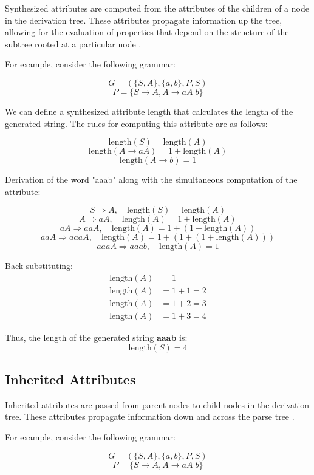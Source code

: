 Synthesized attributes are computed from the attributes of the children of a node in the derivation tree. These attributes propagate information up the tree, allowing for the evaluation of properties that depend on the structure of the subtree rooted at a particular node \cite{cit5}.

For example, consider the following grammar:

\[ G = ( \{S, A\}, \{a, b\}, P, S ) \]
\[  P = \{ S \rightarrow A, A \rightarrow aA | b \} \]
  
We can define a synthesized attribute \( \text{length} \) that calculates the length of the generated string. The rules for computing this attribute are as follows:
  
  
\[  \text{length}(S) = \text{length}(A) \]
\[  \text{length}(A \rightarrow aA) = 1 + \text{length}(A) \]
\[ \text{length}(A \rightarrow b) = 1 \]

Derivation of the word "aaab" along with the simultaneous computation of the attribute:

\[S \Rightarrow A , \quad \text{length}(S) = \text{length}(A)\] 
\[ A \Rightarrow aA , \quad \text{length}(A) = 1 + \text{length}(A)  \]
\[  aA \Rightarrow aaA , \quad \text{length}(A) = 1 + (1 + \text{length}(A))  \]
\[  aaA \Rightarrow aaaA , \quad \text{length}(A) = 1 + (1 + (1 + \text{length}(A)))  \]
\[  aaaA \Rightarrow aaab , \quad \text{length}(A) = 1  \]


Back-substituting:
\[
\begin{aligned}
\text{length}(A) &= 1 \\
\text{length}(A) &= 1 + 1 = 2 \\
\text{length}(A) &= 1 + 2 = 3 \\
\text{length}(A) &= 1 + 3 = 4
\end{aligned}
\]

Thus, the length of the generated string \( \mathbf{aaab} \) is:
\[
\text{length}(S) = 4
\]
  
\subsection{Inherited Attributes}

Inherited attributes are passed from parent nodes to child nodes in the derivation tree. These attributes propagate information down and across the parse tree \cite{cit5}.

For example, consider the following grammar:

\[ G = ( \{S, A\}, \{a, b\}, P, S ) \]
\[ P = \{ S \rightarrow A, A \rightarrow aA | b \} \]

